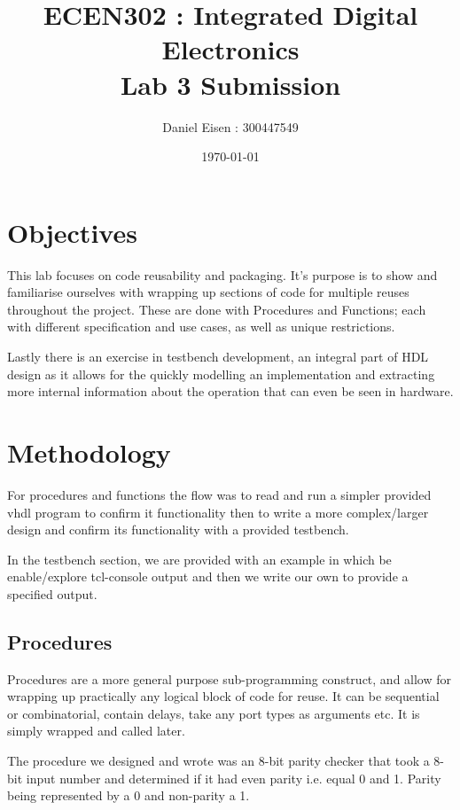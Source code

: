 \documentclass[11pt]{article}
\title{ECEN302 : Integrated Digital Electronics \\ Lab 3 Submission}
\author{Daniel Eisen : 300447549}
\date{\today}
\begin{document}
\begin{preview}
\maketitle
\section{Objectives}
This lab focuses on code reusability and packaging. It's purpose is to show and familiarise ourselves with wrapping up sections of code for multiple reuses throughout the project. These are done with Procedures and Functions; each with different specification and use cases, as well as unique restrictions.

Lastly there is an exercise in testbench development, an integral part of HDL design as it allows for the quickly modelling an implementation and extracting more internal information about the operation that can even be seen in hardware.

\section{Methodology}
  For procedures and functions the flow was to read and run a simpler provided vhdl program to confirm it functionality then to write a more complex/larger design and confirm its functionality with a provided testbench.

  In the testbench section, we are provided with an example in which be enable/explore tcl-console output and then we write our own to provide a specified output.
  \subsection{Procedures}
  Procedures are a more general purpose sub-programming construct, and allow for wrapping up practically any logical block of code for reuse. It can be sequential or combinatorial, contain delays, take any port types as arguments etc. It is simply wrapped and called later.
  

  The procedure we designed and wrote was an 8-bit parity checker that took a 8-bit input number and determined if it had even parity i.e. equal 0 and 1. Parity being represented by a 0 and non-parity a 1.


\end{preview}
\end{document}
